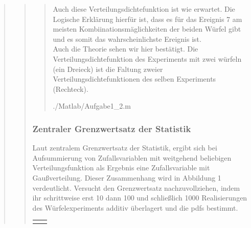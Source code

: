 \begin{quote}
\begin{quote}
\begin{quote}
            Auch diese Verteilungsdichtefunktion ist wie erwartet. 
            Die Logische Erklärung hierfür ist, dass es für das Ereignis 7 am meisten Kombiinationsmäglichkeiten
            der beiden Würfel gibt und es somit das wahrscheinlichste Ereignis ist.\\
            Auch die Theorie sehen wir hier bestätigt. Die Verteilungsdichtefunktion des Experiments mit zwei würfeln (ein
            Dreieck) ist die Faltung zweier Verteilungsdichtefunktionen des selben Experiments (Rechteck).
            
            
            
                {./Matlab/Aufgabe1_2.m}
                
        \end{quote}
        
        
        
        \subsubsection{Zentraler Grenzwertsatz der Statistik}
        Laut zentralem Grenzwertsatz der Statistik, ergibt sich bei Aufsummierung von Zufallsvariablen mit
        weitgehend beliebigen Verteilungsfunktion als Ergebnis eine Zufallsvariable mit Gaußverteilung.
        Dieser Zusammenhang wird in Abbildung 1 verdeutlicht. Versucht den Grenzwertsatz nachzuvollziehen, indem ihr schrittweise
        erst 10 dann 100 und schließlich 1000 Realisierungen des Würfelexperiments additiv überlagert und die pdfs bestimmt.

        
        \begin{center}
        \begin{tabular}{ll}
        
        \hspace{-5cm}
            \begin{minipage}{0.6\textwidth}
                

\end{minipage}
\end{tabular}
\end{center}
\end{quote}
\end{quote}

